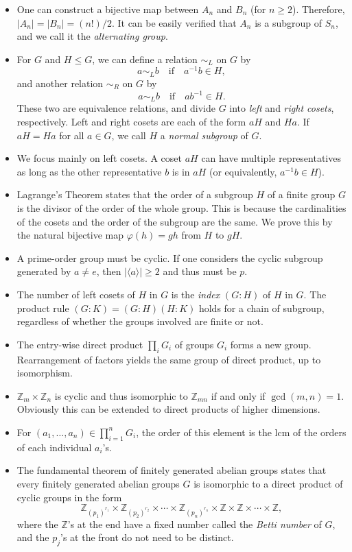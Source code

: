 \documentclass{article}
\newcommand{\Z}{\mathbb{Z}}
\newcommand{\ga}{\langle a \rangle}
\renewcommand{\phi}{\varphi}
\begin{document}
\begin{itemize}
    \item One can construct a bijective map between $A_n$ and $B_n$ (for $n \geq 2$). Therefore, $|A_n| = |B_n| = (n!)/2$. It can be easily verified that $A_n$ is a subgroup of $S_n$, and we call it the \textit{alternating group}.
    \item For $G$ and $H \leq G$, we can define a relation $\sim_L$ on $G$ by $$a \sim_L b \quad \text{if} \quad a^{-1}b \in H,$$ and another relation $\sim_R$ on $G$ by $$a \sim_L b \quad \text{if} \quad ab^{-1} \in H.$$ These two are equivalence relations, and divide $G$ into \textit{left} and \textit{right cosets}, respectively. Left and right cosets are each of the form $aH$ and $Ha$. If $aH = Ha$ for all $a \in G$, we call $H$ a \textit{normal subgroup} of $G$.
    \item We focus mainly on left cosets. A coset $aH$ can have multiple representatives as long as the other representative $b$ is in $aH$ (or equivalently, $a^{-1}b \in H$).
    \item Lagrange's Theorem states that the order of a subgroup $H$ of a finite group $G$ is the divisor of the order of the whole group. This is because the cardinalities of the cosets and the order of the subgroup are the same. We prove this by the natural bijective map $\phi(h) = gh$ from $H$ to $gH$.
    \item A prime-order group must be cyclic. If one considers the cyclic subgroup generated by $a \not= e$, then $|\ga| \geq 2$ and thus must be $p$.
    \item The number of left cosets of $H$ in $G$ is the \textit{index} $(G:H)$ of $H$ in $G$. The product rule $(G:K) = (G:H)(H:K)$ holds for a chain of subgroup, regardless of whether the groups involved are finite or not.
    \item The entry-wise direct product $\prod_{i} G_i$ of groups $G_i$ forms a new group. Rearrangement of factors yields the same group of direct product, up to isomorphism.
    \item $\Z_m \times \Z_n$ is cyclic and thus isomorphic to $\Z_{mn}$ if and only if $\gcd(m,n) = 1$. Obviously this can be extended to direct products of higher dimensions.
    \item For $(a_1, \dots, a_n) \in \prod_{i=1}^n G_i$, the order of this element is the lcm of the orders of each individual $a_i$'s.
    \item The fundamental theorem of finitely generated abelian groups states that every finitely generated abelian groups $G$ is isomorphic to a direct product of cyclic groups in the form $$\Z_{(p_1)^{r_1}} \times \Z_{(p_2)^{r_2}} \times \cdots \times \Z_{(p_n)^{r_n}} \times \Z \times \Z \times \cdots \times \Z,$$ where the $\Z$'s at the end have a fixed number called the \textit{Betti number} of $G$, and the $p_j$'s at the front do not need to be distinct.

\end{itemize}
\end{document}
